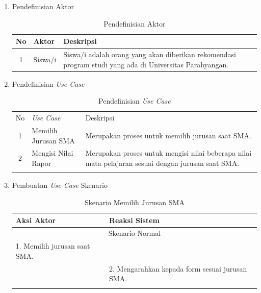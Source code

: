 \begin{enumerate}
    \item Pendefinisian Aktor
    
    \begin{table}[H]
        \centering
        \begin{tabular}{|c|p{4cm}|p{8cm}|}
            \hline
            No & Aktor & Deskripsi  \\
            \hline
            1 & Siswa/i &  Siswa/i adalah orang yang akan diberikan rekomendasi program studi yang ada di Universitas Parahyangan.\\
            \hline
        \end{tabular}
        \caption{Pendefinisian Aktor}
        \label{tab:pendefsian aktor}
    \end{table}
    
    \item Pendefinisian \textit{Use Case}
    
    \begin{longtable}[H]{|c|p{4cm}|p{8cm}|}
            \hline
            No & \textit{Use Case} & Deskripsi  \\
            1 & Memilih Jurusan SMA & Merupakan proses untuk memilih jurusan saat SMA. \\
            \hline
            2 & Mengisi Nilai Rapor & Merupakan proses untuk mengisi nilai beberapa nilai mata pelajaran sesuai dengan jurusan saat SMA. \\ 
            \hline
        \caption{Pendefinisian \textit{Use Case}}
        \label{tab:pendefinisian use case}
    \end{longtable}
    
    \item Pembuatan \textit{Use Case} Skenario
    
    \begin{longtable}[H]{|p{6.5cm}|p{6.5cm}|}
            \hline
            Aksi Aktor & Reaksi Sistem \\
            \hline
            \multicolumn{2}{|c|}{Skenario Normal}\\
            \hline
            1. Memilih jurusan saat SMA. & \\
            \hline
             & 2. Mengarahkan kepada form sesuai jurusan SMA. \\
            \hline
        \caption{Skenario Memilih Jurusan SMA}
        \label{tab:skenario memilih jurusan sma}
    \end{longtable}
    

\end{enumerate}
